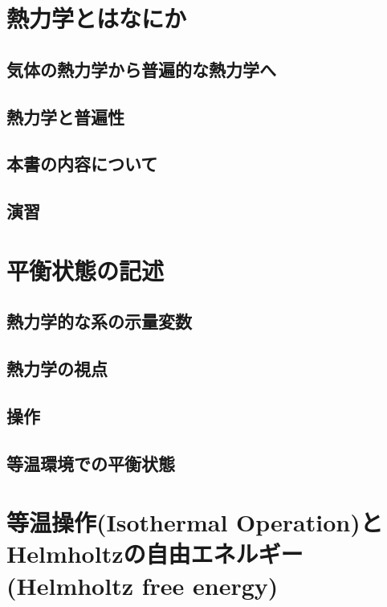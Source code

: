 \documentclass[dvipdfmx,oneside]{jsbook}
\begin{document}
\tableofcontents

\chapter{熱力学とはなにか}

\section{気体の熱力学から普遍的な熱力学へ}

\section{熱力学と普遍性}
\section{本書の内容について}

\section*{演習}


\chapter{平衡状態の記述}

\section{熱力学的な系の示量変数}

\section{熱力学の視点}

\section{操作}

\section{等温環境での平衡状態}


\chapter{等温操作(Isothermal Operation)とHelmholtzの自由エネルギー(Helmholtz free energy)}

\end{document}
